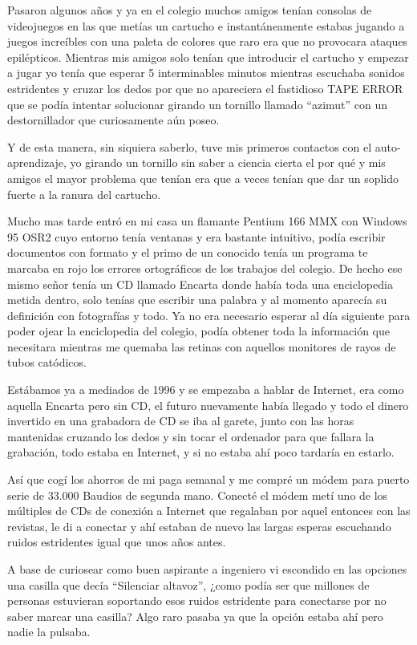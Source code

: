 \bigskip
Pasaron algunos años y ya en el colegio muchos amigos tenían consolas de videojuegos en las que metías un cartucho e instantáneamente estabas jugando a juegos increíbles con una paleta de colores que raro era que no provocara ataques epilépticos. Mientras mis amigos solo tenían que introducir el cartucho y empezar a jugar yo tenía que esperar 5 interminables minutos mientras escuchaba sonidos estridentes y cruzar los dedos por que no apareciera el fastidioso TAPE ERROR que se podía intentar solucionar girando un tornillo llamado ``azimut'' con un destornillador que curiosamente aún poseo.

\bigskip
Y de esta manera, sin siquiera saberlo, tuve mis primeros contactos con el auto-aprendizaje, yo girando un tornillo sin saber a ciencia cierta el por qué y mis amigos el mayor problema que tenían era que a veces tenían que dar un soplido fuerte a la ranura del cartucho.

\bigskip
Mucho mas tarde entró en mi casa un flamante Pentium 166 MMX con Windows 95 OSR2 cuyo entorno tenía ventanas y era bastante intuitivo, podía escribir documentos con formato y el primo de un conocido tenía un programa te marcaba en rojo los errores ortográficos de los trabajos del colegio. De hecho ese mismo señor tenía un CD llamado Encarta donde había toda una enciclopedia metida dentro, solo tenías que escribir una palabra y al momento aparecía su definición con fotografías y todo. Ya no era necesario esperar al día siguiente para poder ojear la enciclopedia del colegio, podía obtener toda la información que necesitara mientras me quemaba las retinas con aquellos monitores de rayos de tubos catódicos.

\bigskip
Estábamos ya a mediados de 1996 y se empezaba a hablar de Internet, era como aquella Encarta pero sin CD, el futuro nuevamente había llegado y todo el dinero invertido en una grabadora de CD se iba al garete, junto con las horas mantenidas cruzando los dedos y sin tocar el ordenador para que fallara la grabación, todo estaba en Internet, y si no estaba ahí poco tardaría en estarlo.

\bigskip
Así que cogí los ahorros de mi paga semanal y me compré un módem para puerto serie de 33.000 Baudios de segunda mano. Conecté el módem metí uno de los múltiples de CDs de conexión a Internet que regalaban por aquel entonces con las revistas, le di a conectar y ahí estaban de nuevo las largas esperas escuchando ruidos estridentes igual que unos años antes.

\bigskip
A base de curiosear como buen aspirante a ingeniero vi escondido en las opciones una casilla que decía ``Silenciar altavoz'', ¿como podía ser que millones de personas estuvieran soportando esos ruidos estridente para conectarse por no saber marcar una casilla? Algo raro pasaba ya que la opción estaba ahí pero nadie la pulsaba.

